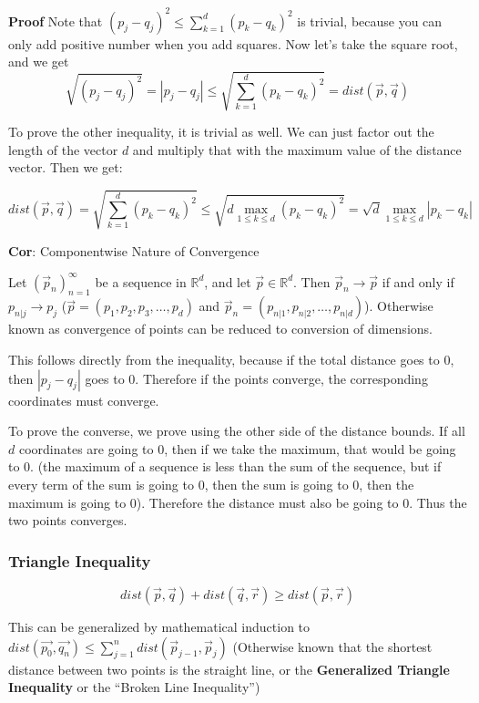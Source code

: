 \textbf{Proof}
Note that $(p_j - q_j)^2 \leq \sum_{k = 1}^d (p_k - q_k)^2$ is trivial, because
you can only add positive number when you add squares. Now let's take the square
root, and we get
$$\sqrt{(p_j - q_j)^2} = |p_j - q_j| \leq \sqrt{\sum_{k = 1}^d (p_k - q_k)^2} =
dist(\vec{p}, \vec{q})$$

To prove the other inequality, it is trivial as well. We can just factor out the
length of the vector $d$ and multiply that with the maximum value of the
distance vector. Then we get:

$$dist(\vec{p}, \vec{q}) = \sqrt{\sum_{k = 1}^d (p_k - q_k)^2} \leq \sqrt{d \max_{1 \leq k \leq d} (p_k -
q_k)^2} = \sqrt{d} \max_{1 \leq k \leq
d} |p_k - q_k|$$

\textbf{Cor}: Componentwise Nature of Convergence

Let $(\vec{p}_n)_{n = 1}^\infty$ be a sequence in $\mathbb{R}^d$, and let
$\vec{p} \in \mathbb{R}^d$. Then $\vec{p}_n \to \vec{p}$ if and only if
$p_{n|j} \to p_j$ ($\vec{p} = (p_1, p_2, p_3, \dots, p_d)$ and $\vec{p}_n =
(p_{n|1}, p_{n|2}, \dots, p_{n|d})$). Otherwise known as convergence of points
can be reduced to conversion of dimensions.

This follows directly from the inequality, because if the total distance goes to
0, then $|p_j - q_j|$ goes to 0. Therefore if the points converge, the
corresponding coordinates must converge.

To prove the converse, we prove using the other side of the distance bounds. If
all $d$ coordinates are going to 0, then if we take the maximum, that would be
going to 0. (the maximum of a sequence is less than the sum of the sequence, but
if every term of the sum is going to 0, then the sum is going to 0, then the
maximum is going to 0). Therefore the distance must also be going to 0. Thus the two points converges.

\subsubsection{Triangle Inequality}
$$dist(\vec{p}, \vec{q}) + dist(\vec{q}, \vec{r}) \geq dist(\vec{p}, \vec{r})$$

This can be generalized by mathematical induction to $dist(\vec{p_0}, \vec{q_n})
\leq \sum_{j = 1}^n dist(\vec{p}_{j - 1}, \vec{p}_{j})$ (Otherwise known that the
shortest distance between two points is the straight line, or the \textbf{Generalized
Triangle Inequality} or the ``Broken Line Inequality'')

